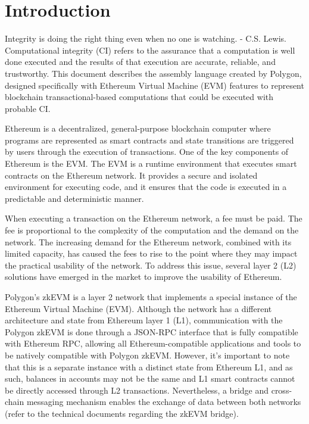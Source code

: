 \section{Introduction}

Integrity is doing the right thing even when no one is watching. - C.S. Lewis. Computational integrity (CI) refers to the assurance that a computation is well done executed and the results of that execution are accurate, reliable, and trustworthy. This document describes the assembly language created by Polygon, designed specifically with Ethereum Virtual Machine (EVM) features to represent blockchain transactional-based computations that could be executed with probable CI.


Ethereum is a decentralized, general-purpose blockchain computer where programs are represented as smart contracts and state transitions are triggered by users through the execution of transactions. One of the key components of Ethereum is the EVM. The EVM is a runtime environment that executes smart contracts on the Ethereum network. It provides a secure and isolated environment for executing code, and it ensures that the code is executed in a predictable and deterministic manner. 

When executing a transaction on the Ethereum network, a fee must be paid. The fee is proportional to the complexity of the computation and the demand on the network. The increasing demand for the Ethereum network, combined with its limited capacity, has caused the fees to rise to the point where they may impact the practical usability of the network. To address this issue, several layer 2 (L2) solutions have emerged in the market to improve the usability of Ethereum.

Polygon's zkEVM is a layer 2 network that implements a special instance of the Ethereum Virtual Machine (EVM). Although the network has a different architecture and state from Ethereum layer 1 (L1), communication with the Polygon zkEVM is done through a JSON-RPC interface that is fully compatible with Ethereum RPC, allowing all Ethereum-compatible applications and tools to be natively compatible with Polygon zkEVM. However, it's important to note that this is a separate instance with a distinct state from Ethereum L1, and as such, balances in accounts may not be the same and L1 smart contracts cannot be directly accessed through L2 transactions. Nevertheless, a bridge and cross-chain messaging mechanism enables the exchange of data between both networks (refer to the technical documents regarding the zkEVM bridge).



